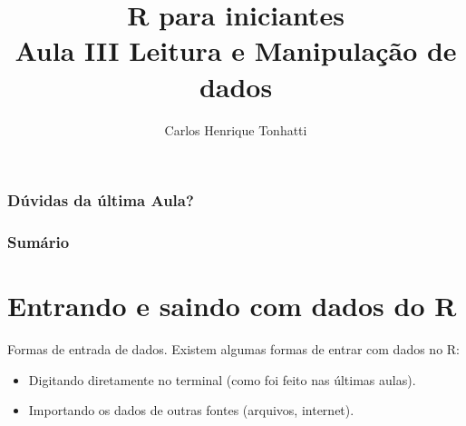 \documentclass{beamer}
\title[Linguagem R]{R para iniciantes\\ Aula III Leitura e Manipulação de dados}
\author {Carlos Henrique Tonhatti}
\date{}
\begin{document}
\frame{\titlepage} %

\begin{frame}
  \frametitle{Dúvidas da última Aula?}
\end{frame}

\begin{frame}
 \frametitle{Sumário}
 \tableofcontents[pausesections]
  \setcounter{tocdepth}{2}%
\end{frame}



\section{Entrando  e saindo com dados do R}
\begin{frame}{Formas de entrada de dados.}
\centering
   Existem algumas formas de entrar com dados no R: \vspace{10pt}
   \begin{itemize}
   \item Digitando diretamente no terminal (como foi feito nas últimas aulas).
   \item Importando os dados de outras fontes (arquivos, internet).
   \end{itemize}
  \end{frame}
\end{document}

